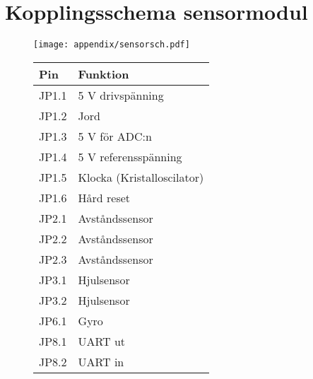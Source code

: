 \newpage
\appendix

\section{Kopplingsschema sensormodul}
\label{sensor-sch}
  \begin{figure}[ht!]
    \centering
      \texttt{[image: appendix/sensorsch.pdf]}
      \begin{tabular}{| l | l |}
        \hline
        \textbf{Pin} & \textbf{Funktion} \\ \hline
        JP1.1 & 5 V drivspänning \\ \hline
        JP1.2 & Jord \\ \hline
        JP1.3 & 5 V för ADC:n \\ \hline
        JP1.4 & 5 V referensspänning \\ \hline
        JP1.5 & Klocka (Kristalloscilator) \\ \hline
        JP1.6 & Hård reset \\ \hline
        JP2.1 & Avståndssensor \\ \hline
        JP2.2 & Avståndssensor \\ \hline
        JP2.3 & Avståndssensor \\ \hline
        JP3.1 & Hjulsensor \\ \hline
        JP3.2 & Hjulsensor \\ \hline
        JP6.1 & Gyro \\ \hline
        JP8.1 & UART ut \\ \hline
        JP8.2 & UART in \\ \hline
      \end{tabular}
    \end{figure}

\newpage

